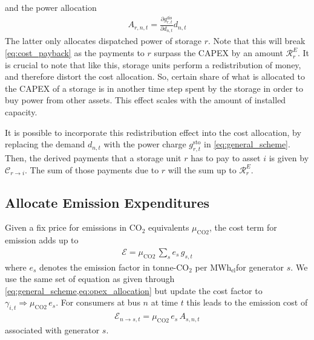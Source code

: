 \documentclass[11pt,twocolumn]{article}
\newcommand{\pdv}[2]{\frac{\partial #1}{\partial #2}}
\newcommand{\costfactor}{\gamma_{i,t}}
\newcommand{\generation}{g_{s,t}}
\newcommand{\storage}{g_{r,t}}
\newcommand{\storagedispatch}{\storage^\text{dis}}
\newcommand{\storagecharge}{\storage^\text{sto}}
\newcommand{\demand}[1][n]{d_{#1,t}}
\newcommand{\allocategeneration}[1][s, n]{A_{#1,t}}
\newcommand{\allocatestoragedispatch}[1][r, n]{A_{#1,t}}
\newcommand{\allocatecapexstorage}[1][n \rightarrow r]{\mathcal{C}^{E}_{#1,t}}
\newcommand{\allocateemissioncost}[1][n \rightarrow s]{\mathcal{E}_{#1,t}}
\newcommand{\emission}{e_{s}}
\newcommand{\emissionprice}{\mu_{\text{CO2}}}
\newcommand{\megawatthour}{MWh$_\text{el}$}
\newcommand{\cost}{\mathcal{C}}
\newcommand{\capexstorage}{\mathcal{C}^E}
\newcommand{\emissioncost}{\mathcal{E}}
\newcommand{\remainingcost}{\mathcal{R}}
\begin{document}
and the power allocation 
\begin{align}
    \allocatestoragedispatch = \pdv{\storagedispatch}{\demand} \demand
\end{align}
The latter only allocates dispatched power of storage $r$. Note that this will break \cref{eq:cost_payback} as the payments to $r$ surpass the CAPEX by an amount $\remainingcost^E_r$. 
It is crucial to note that like this, storage units perform a redistribution of money, and therefore distort the cost allocation. So, certain share of what is allocated to the CAPEX of a storage is in another time step spent by the storage in order to buy power from other assets. This effect scales with the amount of installed capacity.

It is possible to incorporate this redistribution effect into the cost allocation, by replacing the demand $\demand$ with the power charge $\storagecharge$ in \cref{eq:general_scheme}. Then, the derived payments that a storage unit $r$ has to pay to asset $i$ is given by $\cost_{r \rightarrow i}$. The sum of those payments due to $r$ will the sum up to $\remainingcost^E_r$. 




\subsection{Allocate Emission Expenditures}

Given a fix price for emissions in CO$_2$ equivalents $\emissionprice$, the cost term for emission adds up to 
\begin{align}
 \emissioncost = \emissionprice \, \sum_s  \emission \, \generation
\end{align}
where $\emission$ denotes the emission factor in tonne-CO$_2$ per \megawatthour for generator $s$.
We use the same set of equation as given through \cref{eq:general_scheme,eq:opex_allocation} but update the cost factor to $\costfactor \Rightarrow \emissionprice \, \emission$. For consumers at bus $n$ at time $t$ this leads to the emission cost of 
\begin{align}
 \allocateemissioncost = \emissionprice \, \emission \, \allocategeneration
\end{align}
associated with generator $s$.
\end{document}
